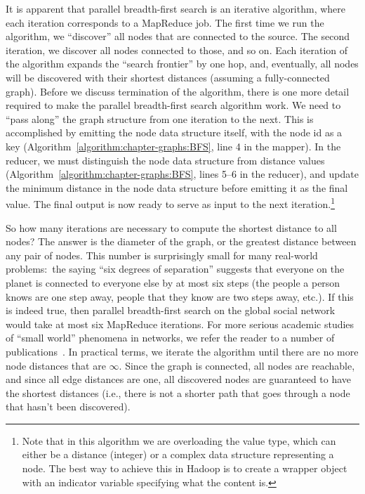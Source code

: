 It is apparent that parallel breadth-first search is an iterative
algorithm, where each iteration corresponds to a MapReduce job.  The
first time we run the algorithm, we ``discover'' all nodes that are
connected to the source.  The second iteration, we discover all nodes
connected to those, and so on.  Each iteration of the algorithm
expands the ``search frontier'' by one hop, and, eventually, all nodes
will be discovered with their shortest distances (assuming a
fully-connected graph).  Before we discuss termination of the
algorithm, there is one more detail required to make the parallel
breadth-first search algorithm work.  We need to ``pass along'' the
graph structure from one iteration to the next.  This is accomplished
by emitting the node data structure itself, with the node id as a key
(Algorithm~\ref{algorithm:chapter-graphs:BFS}, line 4 in the mapper).  In the
reducer, we must distinguish the node data structure from distance
values (Algorithm~\ref{algorithm:chapter-graphs:BFS}, lines 5--6 in the reducer),
and update the minimum distance in the node data structure before
emitting it as the final value.  The final output is now ready to
serve as input to the next iteration.\footnote{Note that in this
  algorithm we are overloading the value type, which can either be a
  distance (integer) or a complex data structure representing a node.
  The best way to achieve this in Hadoop is to create a wrapper object
  with an indicator variable specifying what the content is.}

So how many iterations are necessary to compute the shortest distance
to all nodes?  The answer is the diameter of the graph, or the
greatest distance between any pair of nodes.  This number is
surprisingly small for many real-world problems:\ the saying ``six
degrees of separation'' suggests that everyone on the planet is
connected to everyone else by at most six steps (the people a person
knows are one step away, people that they know are two steps away,
etc.).  If this is indeed true, then parallel breadth-first search on
the global social network would take at most six MapReduce iterations.
For more serious academic studies of ``small world'' phenomena in
networks, we refer the reader to a number of
publications~\cite{Granovetter73,Granovetter83,Watts_Strogatz_1998,Albert_Barabasi_2002}.
In practical terms, we iterate the algorithm until there are no more
node distances that are $\infty$.  Since the graph is connected, all
nodes are reachable, and since all edge distances are one, all
discovered nodes are guaranteed to have the shortest distances (i.e.,
there is not a shorter path that goes through a node that hasn't been
discovered).

